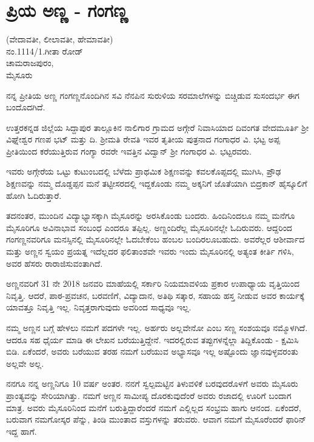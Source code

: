 \chapter{ಪ್ರಿಯ ಅಣ್ಣ - ಗಂಗಣ್ಣ} 

\begin{center}
\smallskip

(ವೇದಾವತೀ, ಲೀಲಾವತೀ, ಹೇಮಾವತೀ)\\
ನಂ.1114/1.ಗೀತಾ ರೋಡ್\\
ಚಾಮರಾಜಪುರಂ,\\ 
ಮೈಸೂರು
\end{center}

ನನ್ನ ಪ್ರೀತಿಯ ಅಣ್ಣ ಗಂಗಣ್ಣನೊಂದಿಗಿನ ಸವಿ ನೆನಪಿನ ಸುರುಳಿಯ ಸರಮಾಲೆಗಳನ್ನು ಬಿಚ್ಚಿಡುವ ಸುಸಂದರ್ಭ ಈಗ ಬಂದೊದಗಿದೆ.

ಉತ್ತರಕನ್ನಡ ಜಿಲ್ಲೆಯ ಸಿದ್ದಾಪುರ ತಾಲ್ಲೂಕಿನ ನಾಲಿಗಾರ ಗ್ರಾಮದ ಅಗ್ಗೇರೆ ನಿವಾಸಿಯಾದ ದಿವಂಗತ ವೇದಮೂರ್ತಿ ಶ್ರೀ ವಿಘ್ನೇಶ್ವರ ಗಣಪ ಭಟ್ ಮತ್ತು ದಿ. ಶ್ರೀಮತಿ ರೇವತಿ ಇವರ ತೃತೀಯ ಪುತ್ರನಾದ ಗಂಗಾಧರ ವಿ. ಭಟ್ಟ  ಅಪ್ಪ ಪ್ರೀತಿಯಿಂದ ಕರೆಯುತ್ತಿರುವ ಗಂಗ್ಯಾ ರವರೇ ಇವತ್ತಿನ ವಿದ್ವಾನ್ ಶ್ರೀ ಗಂಗಾಧರ ವಿ. ಭಟ್ಟರವರು.

ಇವರು ಅಗ್ಗೇರೆಯ ಒಟ್ಟು ಕುಟುಂಬದಲ್ಲಿ ಬೆಳೆದು ಪ್ರಾಥಮಿಕ ಶಿಕ್ಷಣವನ್ನು ಕವಲಕೊಪ್ಪದಲ್ಲಿ ಮುಗಿಸಿ, ಪ್ರೌಢ  ಶಿಕ್ಷಣವನ್ನು ನಮ್ಮ ದೊಡ್ಡಪ್ಪನ ಮನೆ ತಟ್ಟೀಸರದಲ್ಲಿ ಇದ್ದಕೊಂಡು ನಮ್ಮ ಅಕ್ಕನಿಗೆ ಜೊತೆಯಾಗಿ  ಬಿದ್ರಕಾನ್ ಹೈಸ್ಕೂಲಿಗೆ ಹೋಗಿ ಓದಿರುತ್ತಾರೆ.

ತದನಂತರ, ಮುಂದಿನ ವಿದ್ಯಾಭ್ಯಾಸಕ್ಕಾಗಿ ಮೈಸೂರನ್ನು ಅರಸಿಕೊಂಡು ಬಂದರು. ಹಿಂದಿನಿಂದಲೂ ನಮ್ಮ ಮನೆಗೂ ಮೈಸೂರಿಗೂ ಅವಿನಾಭಾವ ಸಂಬಂಧ ಎಂದರೂ ತಪ್ಪಿಲ್ಲ.  ಅಣ್ಣಂದಿರೆಲ್ಲ ಮೈಸೂರಿನಲ್ಲೇ ಓದಿರುವರು. ಆದ್ದರಿಂದ ಗಂಗಣ್ಣನವರಿಗೂ ಮನಸ್ಸಿನಲ್ಲಿ ಮೈಸೂರಿನಲ್ಲೇ ಓದಬೇಕೆಂಬ ಹಂಬಲ ಬಂದಿರಲೂಬಹುದು.  ಅವರೆಲ್ಲರ ಆಶೀರ್ವಾದ ಮತ್ತು ಅಣ್ಣನ ಸ್ವಯಂ ಪ್ರಯತ್ನ ಇದೆಲ್ಲದರ ಫಲಿತಾಂಶವೇ ಇವರು ಇಂದು ಮೈಸೂರಿನಲ್ಲಿ ಅತ್ಯಂತ ಕೀರ್ತಿ ಗಳಿಸಿ, ಅವರ ಹೆಸರು ರಾರಾಜಿಸುವಂತಾಗಿದೆ.

ಅಣ್ಣನವರಿಗೆ 31 ನೇ 2018 ಜನವರಿ ಮಾಹೆಯಲ್ಲಿ ಸರ್ಕಾರಿ ನಿಯಮಾವಳಿಯ ಪ್ರಕಾರ ಉಪಾಧ್ಯಾಯ ವೃತ್ತಿಯಿಂದ  ನಿವೃತ್ತಿ.  ಆದರೆ,  ಪಾಠ-ಪ್ರವಚನ, ಬರವಣಿಗೆ, ವಿದ್ಯಾದಾನ, ಅತಿಥಿ ಸತ್ಕಾರ, ಸಹಾಯ ಹಸ್ತ ನೀಡುವ ಅವರ ಕಾರ್ಯಕ್ಕೆ ಯಾವತ್ತೂ  ನಿವೃತ್ತಿ ಇಲ್ಲ. ನಿವೃತ್ತರಾಗುವುದು ಅವರಿಂದ ಸಾಧ್ಯವೂ ಇಲ್ಲ.

ನಮ್ಮ ಅಣ್ಣನ ಬಗ್ಗೆ ಹೇಳಲು ನಮಗೆ ಪದಗಳೇ ಇಲ್ಲ. ಅರ್ಹರು ಅಲ್ಲವೇನೋ ಎಂಬ ಸಣ್ಣ ಸಂಶಯವೂ ನಮ್ಮೊಳಗಿದೆ.  ಆದರೂ ಸಹ ಧೈರ್ಯ ಮಾಡಿ ಈ ಲೇಖನ ಬರೆಯುತ್ತಿದ್ದೇನೆ.  ಇದರಲ್ಲಿರುವ ತಪ್ಪುಗಳನ್ನೆಲ್ಲಾ ತಿದ್ದಿಕೊಂಡು - ಕ್ಷಮಿಸಿ ಬಿಡಿ.  ಏಕೆಂದರೆ, ಅವರು ಬರೆಯುವ ತರಹ ನಮಗೆ ಬರೆಯುವ ಅಭ್ಯಾಸವೂ ಇಲ್ಲ ಅಷ್ಟೊಂದು ಜ್ಞಾನವುಳ್ಳವರಂತು ಅಲ್ಲವೇ ಅಲ್ಲ.

ನನಗೂ ನನ್ನ ಅಣ್ಣನಿಗೂ 10 ವರ್ಷ ಅಂತರ. ನನಗೆ ಸ್ವಲ್ಪಮಟ್ಟಿನ ತಿಳುವಳಿಕೆ ಬರವುದರೊಳಗೆ ಅವರು ಮೈಸೂರು ಪ್ರಾಂತ್ಯವನ್ನು ಸೇರಿಯಾಗಿತ್ತು.  ನಮಗೆ ಅಣ್ಣನ ಸಾಮೀಪ್ಯ ದೊರಕುವುದೆಂರೆ ಅವರು ರಜಾದಲ್ಲಿ ಊರಿಗೆ ಬಂದಾಗ ಮಾತ್ರ.  ಅವರು ಮೈಸೂರಿನಿಂದ ಮನೆಗೆ ಬರುತ್ತಿದ್ದಾರೆಂದರೆ ನಮಗೆ ಎಲ್ಲಿಲ್ಲದ ಸಂಭ್ರಮ ಹಾಗು ಆನಂದ.  ಏಕೆಂದರೆ, ಬರುವಾಗ ನಮಗೋಸ್ಕರ ಪೆನ್ನು, ತಿಂಡಿ ಮುಂತಾದ ವಸ್ತುಗಳನ್ನು ತರುವರು. ಆವಾಗ ನಮಗೆ ಮೈಸೂರೆಂದರೆ ಫಾರಿನ್ ಇದ್ದ ಹಾಗೆ. 

